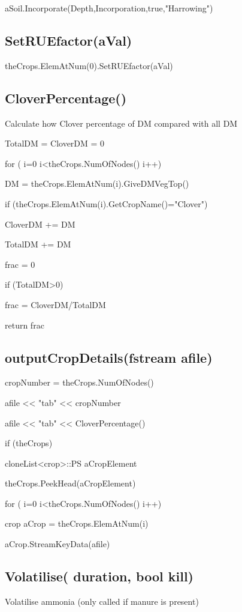 \documentclass[%
]{scrartcl}
\begin{document}
{{{ aSoil.Incorporate(Depth,Incorporation,true,"Harrowing")
   


\subsection{SetRUEfactor(aVal)}	
theCrops.ElemAtNum(0).SetRUEfactor(aVal)

\subsection{CloverPercentage()}
Calculate how Clover percentage of DM compared with all DM

	 TotalDM = CloverDM = 0
	 
   for ( i=0 i<theCrops.NumOfNodes() i++)
   
    \quad 	  DM = theCrops.ElemAtNum(i).GiveDMVegTop()

     \quad   if (theCrops.ElemAtNum(i).GetCropName()="Clover")
     
 \quad  \quad  	CloverDM += DM
     
  \quad  TotalDM += DM


	frac = 0
	
  if (TotalDM>0) 
  
    \quad frac = CloverDM/TotalDM

	return frac


\subsection{outputCropDetails(fstream  afile)}
    cropNumber = theCrops.NumOfNodes()
   
  afile << "tab" << cropNumber
 
    afile << "tab" << CloverPercentage()

   if (theCrops)

\quad
      cloneList<crop>::PS aCropElement
     
\quad theCrops.PeekHead(aCropElement)

   \quad   for ( i=0 i<theCrops.NumOfNodes() i++)
    
\quad\quad     crop    aCrop = theCrops.ElemAtNum(i)
    
 \quad\quad    aCrop.StreamKeyData(afile)





\subsection{Volatilise(  duration, bool kill)}
\citep{sommer2000modelling}
Volatilise ammonia (only called if manure is present)

}}}
\end{document}
